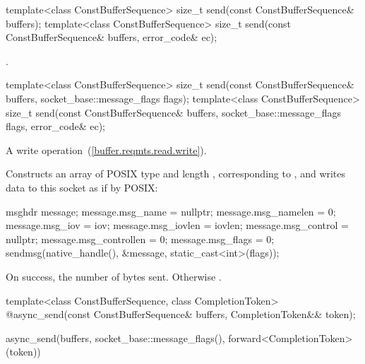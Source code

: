 \begin{itemdecl}
template<class ConstBufferSequence>
  size_t send(const ConstBufferSequence& buffers);
template<class ConstBufferSequence>
  size_t send(const ConstBufferSequence& buffers, error_code& ec);
\end{itemdecl}

\begin{itemdescr}
\pnum
\returns {}.
\end{itemdescr}

\begin{itemdecl}
template<class ConstBufferSequence>
  size_t send(const ConstBufferSequence& buffers,
              socket_base::message_flags flags);
template<class ConstBufferSequence>
  size_t send(const ConstBufferSequence& buffers,
              socket_base::message_flags flags, error_code& ec);
\end{itemdecl}

\begin{itemdescr}
\pnum
A write operation~(\ref{buffer.reqmts.read.write}).

\pnum
\effects Constructs an array  of POSIX type  and length , corresponding to , and writes data to this socket as if by POSIX:
\begin{codeblock}
msghdr message;
message.msg_name = nullptr;
message.msg_namelen = 0;
message.msg_iov = iov;
message.msg_iovlen = iovlen;
message.msg_control = nullptr;
message.msg_controllen = 0;
message.msg_flags = 0;
sendmsg(native_handle(), &message, static_cast<int>(flags));
\end{codeblock}


\pnum
\returns On success, the number of bytes sent. Otherwise .
\end{itemdescr}

\begin{itemdecl}
template<class ConstBufferSequence, class CompletionToken>
  @\DEDUCED@ async_send(const ConstBufferSequence& buffers, CompletionToken&& token);
\end{itemdecl}

\begin{itemdescr}
\pnum
\returns
\begin{codeblock}
async_send(buffers, socket_base::message_flags(), forward<CompletionToken>(token))
\end{codeblock}
\end{itemdescr}

